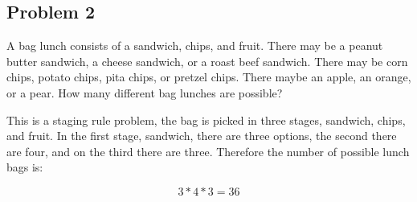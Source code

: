 \documentclass{article}
\begin{document}
\subsection*{Problem 2}
A bag lunch consists of a sandwich, chips, and fruit. There may be a peanut butter sandwich, a cheese sandwich, or a roast beef sandwich. There may be corn chips, potato chips, pita chips, or pretzel chips. There maybe an apple, an orange, or a pear. How many different bag lunches are possible?
\begin{center}
    This is a staging rule problem, the bag is picked in three stages, sandwich, chips, and fruit. In the first stage, sandwich, there are three options, the second there are four, and on the third there are three. Therefore the number of possible lunch bags is:
\end{center}
\begin{equation}
    3*4*3 = \boxed{36}
\end{equation}
\end{document}
